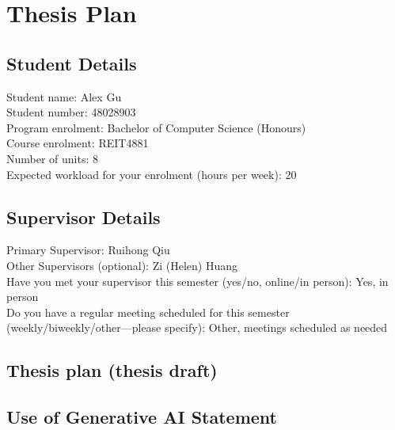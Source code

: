 \documentclass[12pt,openany,a4paper]{book}
\begin{document}
\section*{Thesis Plan}
\pagestyle{empty} %

\subsection*{Student Details}

Student name: Alex Gu\\
Student number: 48028903\\
Program enrolment: Bachelor of Computer Science (Honours)\\
Course enrolment: REIT4881\\
Number of units: 8\\
Expected workload for your enrolment (hours per week): 20

\subsection*{Supervisor Details}

Primary Supervisor: Ruihong Qiu\\
Other Supervisors (optional): Zi (Helen) Huang\\
Have you met your supervisor this semester (yes/no, online/in person): Yes, in person\\
Do you have a regular meeting scheduled for this semester (weekly/biweekly/other---please specify): Other, meetings scheduled as needed


\subsection*{Thesis plan (thesis draft)}


\subsection*{Use of Generative AI Statement}
\end{document}
